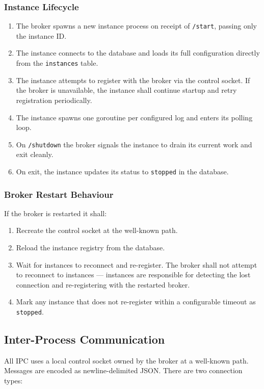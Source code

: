 \documentclass{article}
\begin{document}
\subsubsection{Instance Lifecycle}
\begin{enumerate}
    \item The broker spawns a new instance process on receipt of
    \texttt{/start}, passing only the instance ID.
    \item The instance connects to the database and loads its full
    configuration directly from the \texttt{instances} table.
    \item The instance attempts to register with the broker via the control
    socket. If the broker is unavailable, the instance shall continue startup
    and retry registration periodically.
    \item The instance spawns one goroutine per configured log and enters
    its polling loop.
    \item On \texttt{/shutdown} the broker signals the
    instance to drain its current work and exit cleanly.
    \item On exit, the instance updates its status to \texttt{stopped} in
    the database.
\end{enumerate}

\subsubsection{Broker Restart Behaviour}
If the broker is restarted it shall:
\begin{enumerate}
    \item Recreate the control socket at the well-known path.
    \item Reload the instance registry from the database.
    \item Wait for instances to reconnect and re-register. The broker shall
    not attempt to reconnect to instances --- instances are responsible for
    detecting the lost connection and re-registering with the restarted
    broker.
    \item Mark any instance that does not re-register within a configurable
    timeout as \texttt{stopped}.
\end{enumerate}

\subsection{Inter-Process Communication}
All IPC uses a local control socket owned by the broker at a well-known
path. Messages are encoded as newline-delimited JSON. There are two
connection types:
\end{document}
